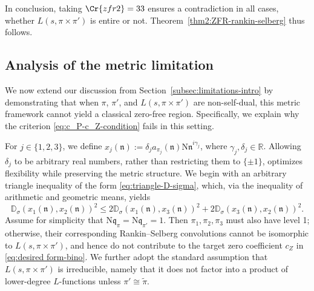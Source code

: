 \documentclass[12pt,reqno]{amsart}
\theoremstyle{remark}
\newcommand{\N}{\mathrm{N}}
\numberwithin{equation}{section}
\begin{document}
    In conclusion, taking $\Cr{zfr2} = 33$ ensures a contradiction in all cases, whether $L(s, \pi \times \pi')$ is entire or not.  Theorem~\ref{thm2:ZFR-rankin-selberg} thus follows.

    \subsection{Analysis of the metric limitation}\label{sec:limitation-proof}

We now extend our discussion from Section~\ref{subsec:limitations-intro} by demonstrating that when $\pi$, $\pi'$, and $L(s,\pi \times \pi')$ are non-self-dual, this metric framework cannot yield a classical zero-free region. Specifically, we explain why the criterion \eqref{eq:c_P-c_Z-condition} fails in this setting.

For $j \in \{1, 2, 3\}$, we define $x_j(\mathfrak{n}) := \delta_j a_{\pi_j}(\mathfrak{n}) \mathrm{N}\mathfrak{n}^{i\gamma_j}$, where $\gamma_j, \delta_j  \in \mathbb{R}$. Allowing $\delta_j$ to be arbitrary real numbers, rather than restricting them to $\{\pm 1\}$, optimizes flexibility while preserving the metric structure. We begin with an arbitrary triangle inequality of the form \eqref{eq:triangle-D-sigma}, which, via the inequality of arithmetic and geometric means, yields 
\begin{equation}\label{eq:triangle-limit}
    \mathbb{D}_{\sigma}(x_1(\mathfrak{n}), x_2(\mathfrak{n}))^2 \le 2\mathbb{D}_{\sigma}(x_1(\mathfrak{n}), x_3(\mathfrak{n}))^2 + 2\mathbb{D}_{\sigma}(x_3(\mathfrak{n}), x_2(\mathfrak{n}))^2. 
\end{equation}
Assume for simplicity that $\N\mathfrak{q}_{\pi}=\N\mathfrak{q}_{\pi'}=1$. Then $\pi_1,\pi_2,\pi_3$ must also have level 1; otherwise, their corresponding Rankin--Selberg convolutions cannot be isomorphic to $L(s,\pi\times\pi')$, and hence do not contribute to the target zero coefficient $c_Z$ in \eqref{eq:desired form-bino}. We further adopt the standard assumption that $L(s,\pi\times\pi')$ is irreducible, namely that it does not factor into a product of lower-degree $L$-functions unless $\pi' \cong \widetilde{\pi}$.
\end{document}

